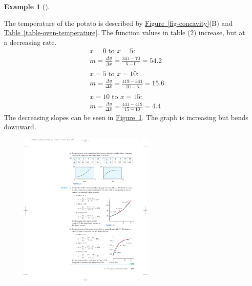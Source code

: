\documentclass[10pt,]{book}
\theoremstyle{plain}
\theoremstyle{definition}
\theoremstyle{definition}
\newtheorem{example}[theorem]{Example}
\numberwithin{equation}{section}
\begin{document}
\begin{example}[]
\begin{enumerate}[label=*\alph**]
            The temperature of the potato is described by \hyperref[fig-concavity]{Figure~\ref{fig-concavity}}(B) and \hyperref[table-oven-temperature]{Table~\ref{table-oven-temperature}}. The function values in table (2) increase, but at a decreasing rate.
            \begin{gather*}
x = 0\text { to } x = 5:\\
m =\frac{\Delta y}{\Delta x}=\frac{341−70}{5 − 0}= 54.2\\
\\
x = 5 \text{ to } x = 10:\\
m =\frac{\Delta y}{\Delta x}=\frac{419 − 341}{10 − 5}= 15.6\\
\\
x = 10 \text{ to } x = 15:\\
m =\frac{\Delta y}{\Delta x}=\frac{441 − 419}{15 − 10}= 4.4
\end{gather*}
        The decreasing slopes can be seen in \hyperref[fig-concave-down]{Figure~\ref{fig-concave-down}}. The graph is increasing but bends downward.
        \leavevmode%
\begin{figure}
\centering
\includegraphics[width=0.60\textwidth,]{images/fig-concave-down.pdf}\caption{\label{fig-concave-down}}
\end{figure}
\end{enumerate}
\end{example}
\end{document}
